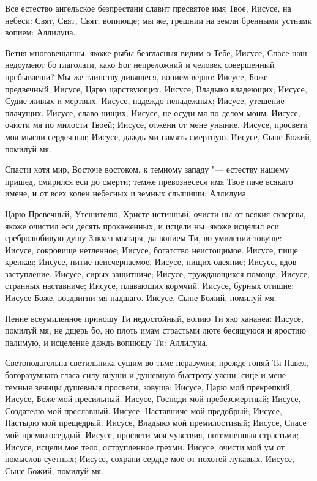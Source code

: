 

Все
естество ангельское безпрестани славит пресвятое имя Твое, Иисусе, на небеси: Свят, Свят, Свят, вопиюще; мы же, грешнии на земли бренными устнами вопием: Аллилуиа. 




Ветия
многовещанны, якоже рыбы безгласныя видим о Тебе, Иисусе, Спасе наш: недоумеют бо глаголати, како Бог непреложний и человек совершенный пребываеши? Мы же таинству дивящеся, вопием верно: Иисусе, Боже предвечный; Иисусе, Царю царствующих. Иисусе, Владыко владеющих; Иисусе, Судие живых и мертвых. Иисусе, надеждо ненадежных; Иисусе, утешение плачущих. Иисусе, славо нищих; Иисусе, не осуди мя по делом моим. Иисусе, очисти мя по милости Твоей; Иисусе, отжени от мене уныние. Иисусе, просвети моя мысли сердечныя; Иисусе, даждь ми память смертную. Иисусе, Сыне Божий, помилуй мя.




Спасти
хотя мир, Восточе востоком, к темному западу "--- естеству нашему пришед, смирился еси до смерти; темже превознесеся имя Твое паче всякаго имене, и от всех колен небесных и земных слышиши: Аллилуиа.




Царю
Превечный, Утешителю, Христе истинный, очисти ны от всякия скверны, якоже очистил еси десять прокаженных, и исцели ны, якоже исцелил еси сребролюбивую душу Закхеа мытаря, да вопием Ти, во умилении зовуще: Иисусе, сокровище нетленное; Иисусе, богатство неистощимое. Иисусе, пище крепкая; Иисусе, питие неисчерпаемое. Иисусе, нищих одеяние; Иисусе, вдов заступление. Иисусе, сирых защитниче; Иисусе, труждающихся помоще. Иисусе, странных наставниче; Иисусе, плавающих кормчий. Иисусе, бурных отишие; Иисусе Боже, воздвигни мя падшаго. Иисусе, Сыне Божий, помилуй мя.




Пение
всеумиленное приношу Ти недостойный, вопию Ти яко хананеа: Иисусе, помилуй мя; не дщерь бо, но плоть имам страстьми люте бесящуюся и яростию палимую, и исцеление даждь вопиющу Ти: Аллилуиа.




Светоподательна
светильника сущим во тьме неразумия, прежде гоняй Тя Павел, богоразумнаго гласа силу внуши и душевную быстроту уясни; сице и мене темныя зеницы душевныя просвети, зовуща: Иисусе, Царю мой прекрепкий; Иисусе, Боже мой пресильный. Иисусе, Господи мой пребезсмертный; Иисусе, Создателю мой преславный. Иисусе, Наставниче мой предобрый; Иисусе, Пастырю мой прещедрый. Иисусе, Владыко мой премилостивый; Иисусе, Спасе мой премилосердый. Иисусе, просвети моя чувствия, потемненныя страстьми; Иисусе, исцели мое тело, острупленное грехми. Иисусе, очисти мой ум от помыслов суетных; Иисусе, сохрани сердце мое от похотей лукавых. Иисусе, Сыне Божий, помилуй мя.


